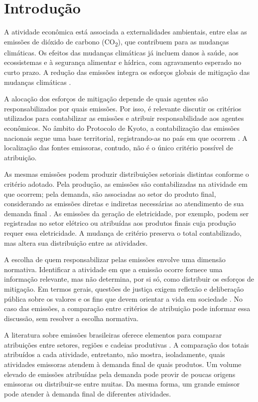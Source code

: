 \section{Introdução}

A atividade econômica está associada a externalidades ambientais, entre elas as emissões de dióxido de carbono (CO\textsubscript{2}), que contribuem para as mudanças climáticas. Os efeitos das mudanças climáticas já incluem danos à saúde, aos ecossistemas e à segurança alimentar e hídrica, com agravamento esperado no curto prazo. A redução das emissões integra os esforços globais de mitigação das mudanças climáticas \parencite{ipcc2023spm}.

A alocação dos esforços de mitigação depende de quais agentes são responsabilizados por quais emissões. Por isso, é relevante discutir os critérios utilizados para contabilizar as emissões e atribuir responsabilidade aos agentes econômicos. No âmbito do Protocolo de Kyoto, a contabilização das emissões nacionais segue uma base territorial, registrando-as no país em que ocorrem \parencite{unfccc2008kyotoManual}. A localização das fontes emissoras, contudo, não é o único critério possível de atribuição.

As mesmas emissões podem produzir distribuições setoriais distintas conforme o critério adotado. Pela produção, as emissões são contabilizadas na atividade em que ocorrem; pela demanda, são associadas ao setor do produto final, considerando as emissões diretas e indiretas necessárias ao atendimento de sua demanda final \parencite{marques2012,millerBlair2009}. As emissões da geração de eletricidade, por exemplo, podem ser registradas no setor elétrico ou atribuídas aos produtos finais cuja produção requer essa eletricidade. A mudança de critério preserva o total contabilizado, mas altera sua distribuição entre as atividades.

A escolha de quem responsabilizar pelas emissões envolve uma dimensão normativa. Identificar a atividade em que a emissão ocorre fornece uma informação relevante, mas não determina, por si só, como distribuir os esforços de mitigação. Em termos gerais, questões de justiça exigem reflexão e deliberação pública sobre os valores e os fins que devem orientar a vida em sociedade \parencite{sandel2015justica}. No caso das emissões, a comparação entre critérios de atribuição pode informar essa discussão, sem resolver a escolha normativa.

A literatura sobre emissões brasileiras oferece elementos para comparar atribuições entre setores, regiões e cadeias produtivas \parencite{imori2015,sanguinetAzzoni2024,montoyaEtAl2026}. A comparação dos totais atribuídos a cada atividade, entretanto, não mostra, isoladamente, quais atividades emissoras atendem à demanda final de quais produtos. Um volume elevado de emissões atribuídas pela demanda pode provir de poucas origens emissoras ou distribuir-se entre muitas. Da mesma forma, um grande emissor pode atender à demanda final de diferentes atividades.

